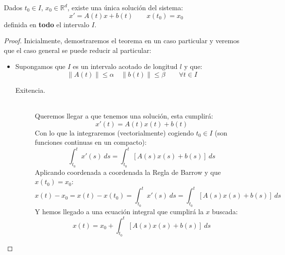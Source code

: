 \begin{teo}\label{teo:existencia_unicidad_sistemas}
    Dados $t_0\in I$, $x_0\in \mathbb{R}^d$, existe una única solución del sistema:
    \begin{equation*}
        x' = A(t)x + b(t) \qquad x(t_0) = x_0
    \end{equation*}
    definida en \textbf{todo} el intervalo $I$.
    \begin{proof}
        Inicialmente, demostraremos el teorema en un caso particular y veremos que el caso general se puede reducir al particular:
        \begin{itemize}
            \item Supongamos que $I$ es un intervalo acotado de longitud $l$ y que:
                \begin{equation*}
                    \|A(t)\| \leq \alpha \quad \|b(t)\|\leq \beta \qquad \forall t\in I
                \end{equation*}
                \begin{description}
                    \item [Exitencia.]~\\
                        Queremos llegar a que tenemos una solución, esta cumplirá:
                        \begin{equation*}
                            x'(t) = A(t)x(t) + b(t)
                        \end{equation*}
                        Con lo que la integraremos (vectorialmente) cogiendo $t_0\in I$ (son funciones continuas en un compacto):
                        \begin{equation*}
                            \int_{t_0}^{t} x'(s)~ds  = \int_{t_0}^{t} [A(s)x(s) + b(s)]~ds 
                        \end{equation*}
                        Aplicando coordenada a coordenada la Regla de Barrow y que $x(t_0) = x_0$:
                        \begin{equation*}
                            x(t) - x_0 = x(t) - x(t_0) = \int_{t_0}^{t} x'(s)~ds  = \int_{t_0}^{t} [A(s)x(s) + b(s)]~ds 
                        \end{equation*}
                        Y hemos llegado a una ecuación integral que cumplirá la $x$ buscada:
                        \begin{equation*}
                            x(t) = x_0 + \int_{t_0}^{t} [A(s)x(s) + b(s)]~ds 
                        \end{equation*}

\end{description}
\end{itemize}
\end{proof}
\end{teo}
